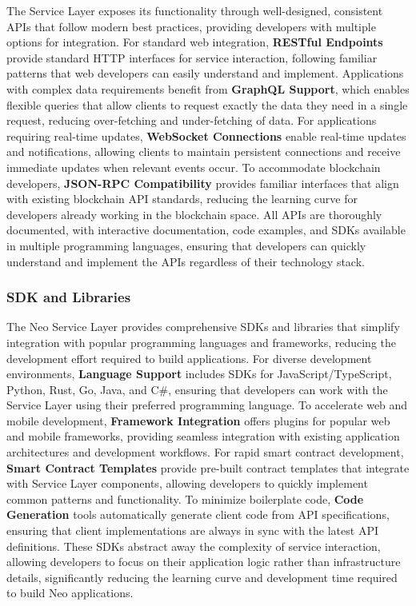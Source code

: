 \documentclass[11pt]{article}
\begin{document}
The Service Layer exposes its functionality through well-designed, consistent APIs that follow modern best practices, providing developers with multiple options for integration. For standard web integration, \textbf{RESTful Endpoints} provide standard HTTP interfaces for service interaction, following familiar patterns that web developers can easily understand and implement. Applications with complex data requirements benefit from \textbf{GraphQL Support}, which enables flexible queries that allow clients to request exactly the data they need in a single request, reducing over-fetching and under-fetching of data. For applications requiring real-time updates, \textbf{WebSocket Connections} enable real-time updates and notifications, allowing clients to maintain persistent connections and receive immediate updates when relevant events occur. To accommodate blockchain developers, \textbf{JSON-RPC Compatibility} provides familiar interfaces that align with existing blockchain API standards, reducing the learning curve for developers already working in the blockchain space. All APIs are thoroughly documented, with interactive documentation, code examples, and SDKs available in multiple programming languages, ensuring that developers can quickly understand and implement the APIs regardless of their technology stack.

\subsubsection{SDK and Libraries}
\label{subsubsec:sdk-libraries}

The Neo Service Layer provides comprehensive SDKs and libraries that simplify integration with popular programming languages and frameworks, reducing the development effort required to build applications. For diverse development environments, \textbf{Language Support} includes SDKs for JavaScript/TypeScript, Python, Rust, Go, Java, and C\#, ensuring that developers can work with the Service Layer using their preferred programming language. To accelerate web and mobile development, \textbf{Framework Integration} offers plugins for popular web and mobile frameworks, providing seamless integration with existing application architectures and development workflows. For rapid smart contract development, \textbf{Smart Contract Templates} provide pre-built contract templates that integrate with Service Layer components, allowing developers to quickly implement common patterns and functionality. To minimize boilerplate code, \textbf{Code Generation} tools automatically generate client code from API specifications, ensuring that client implementations are always in sync with the latest API definitions. These SDKs abstract away the complexity of service interaction, allowing developers to focus on their application logic rather than infrastructure details, significantly reducing the learning curve and development time required to build Neo applications.
\end{document}
